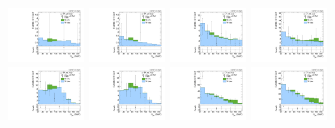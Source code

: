 \begin{figure}[htbp]
  \includegraphics[width=0.18\textwidth]{fig/fitValidation/PostFit_SR_MJJ_MVV1500to5000__mu_HP_vbf_LDy_Run2.pdf}
  \includegraphics[width=0.18\textwidth]{fig/fitValidation/PostFit_SR_MJJ_MVV1500to5000__e_HP_vbf_LDy_Run2.pdf}
  \includegraphics[width=0.18\textwidth]{fig/fitValidation/PostFit_SR_MJJ_MVV1500to5000__mu_LP_vbf_LDy_Run2.pdf}
  \includegraphics[width=0.18\textwidth]{fig/fitValidation/PostFit_SR_MJJ_MVV1500to5000__e_LP_vbf_LDy_Run2.pdf}\\
  \includegraphics[width=0.18\textwidth]{fig/fitValidation/PostFit_SR_MJJ_MVV1500to5000__mu_HP_bb_HDy_Run2.pdf}
  \includegraphics[width=0.18\textwidth]{fig/fitValidation/PostFit_SR_MJJ_MVV1500to5000__e_HP_bb_HDy_Run2.pdf}
  \includegraphics[width=0.18\textwidth]{fig/fitValidation/PostFit_SR_MJJ_MVV1500to5000__mu_LP_bb_HDy_Run2.pdf}
  \includegraphics[width=0.18\textwidth]{fig/fitValidation/PostFit_SR_MJJ_MVV1500to5000__e_LP_bb_HDy_Run2.pdf}\\

\end{figure}
